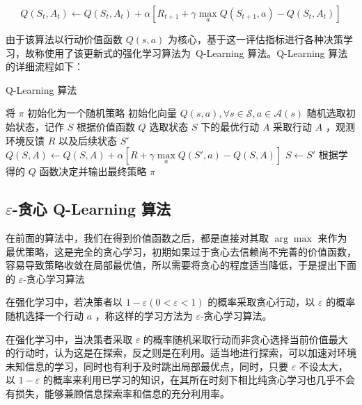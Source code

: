 \begin{equation}\label{eq:qlearning}
    Q(S_t,A_t)\leftarrow Q(S_t,A_t)+\alpha\left[R_{t+1}+\gamma  \max\limits_aQ(S_{t+1},a)-Q(S_t,A_t)\right]
\end{equation}

由于该算法以行动价值函数 $Q(s,a)$ 为核心，基于这一评估指标进行各种决策学习，故称使用了该更新式的强化学习算法为{\jiacu\ Q-Learning 算法}。Q-Learning 算法的详细流程如下：

\begin{algorithm}[H]
    \caption{Q-Learning 算法}
    \begin{algorithmic}[1] %
        \State 将 $\pi$ 初始化为一个随机策略
        \State 初始化向量 $Q(s,a), \forall s\in \mathcal S,a\in \mathcal{A}(s)$
        \Loop
        \State 随机选取初始状态，记作 $S$
        \Repeat
        \State 根据价值函数 $Q$ 选取状态 $S$ 下的最优行动 $A$
        \State 采取行动 $A$ ，观测环境反馈 $R$ 以及后续状态 $S'$
        \State $Q(S,A)\leftarrow Q(S,A)+\alpha\left[R+\gamma  \max\limits_aQ(S',a)-Q(S,A)\right]$
        \State $S\leftarrow S'$
        \EndLoop
        \State
        \State 根据学得的 $Q$ 函数决定并输出最终策略 $\pi$
    \end{algorithmic}
\end{algorithm}

\subsection{$\varepsilon$-贪心 Q-Learning 算法}

在前面的算法中，我们在得到价值函数之后，都是直接对其取 $\arg\max$ 来作为最优策略，这是完全的贪心学习\cite{edmonds1971matroids}，初期如果过于贪心去信赖尚不完善的价值函数，容易导致策略收敛在局部最优值，所以需要将贪心的程度适当降低，于是提出下面的 $\varepsilon$-贪心学习算法

\begin{Definition}
    在强化学习中，若决策者以 $1-\varepsilon(0<\varepsilon<1)$ 的概率采取贪心行动，以 $\varepsilon$ 的概率随机选择一个行动 $a$ ，称这样的学习方法为 $\varepsilon$-贪心学习算法。
\end{Definition}

在强化学习中，当决策者采取 $\varepsilon$ 的概率随机采取行动而非贪心选择当前价值最大的行动时，认为这是在{\jiacu 探索}，反之则是在{\jiacu 利用}。适当地进行探索，可以加速对环境未知信息的学习，同时也有利于及时跳出局部最优点，同时，只要 $\varepsilon$ 不设太大，以 $1-\varepsilon$ 的概率来利用已学习的知识，在其所在时刻下相比纯贪心学习也几乎不会有损失，能够兼顾信息探索率和信息的充分利用率。

